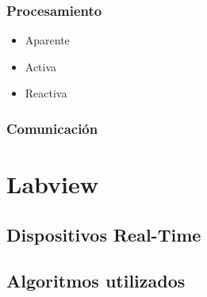     \subsubsection{Procesamiento}

      \begin{itemize}
        \item Aparente
        \item Activa
        \item Reactiva
      \end{itemize}




    \subsubsection{Comunicación}

\section{Labview}
  \subsection{Dispositivos Real-Time}
  \subsection{Algoritmos utilizados}
  
